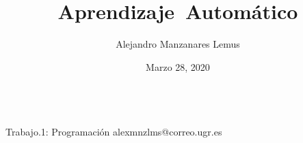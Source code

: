 \documentclass[10pt]{report}
\author{Alejandro Manzanares Lemus}
\title{Aprendizaje\ Automático}
\date{Marzo 28, 2020}
\begin{document}
\aqtitlepage[nolicense]
				{}
            {\\ Trabajo.1: Programación}
            {alexmnzlms@correo.ugr.es}

\tableofcontents


\end{document}
